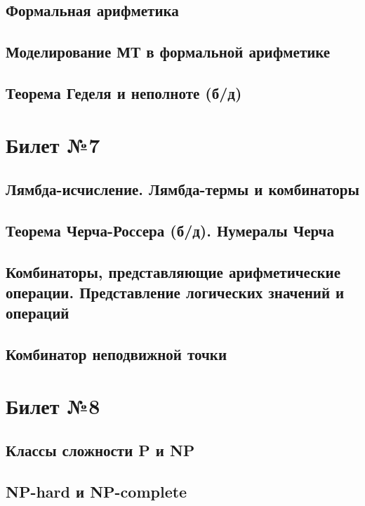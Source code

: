 \documentclass[a4paper]{article}
\theoremstyle{plain}
\theoremstyle{remark}
\theoremstyle{definition}
\begin{document}
\subsection{Формальная арифметика}
\subsection{Моделирование МТ в формальной арифметике}
\subsection{Теорема Геделя и неполноте (б/д)}

\section{Билет №7}
\subsection{Лямбда-исчисление. Лямбда-термы и комбинаторы}
\subsection{Теорема Черча-Россера (б/д). Нумералы Черча}
\subsection{Комбинаторы, представляющие арифметические операции. Представление логических значений и операций}
\subsection{Комбинатор неподвижной точки}

\section{Билет №8}
\subsection{Классы сложности P и NP}
\subsection{NP-hard и NP-complete}
\end{document}
